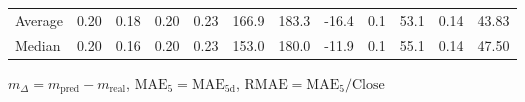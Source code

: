 \begin{threeparttable}
{\begin{tabular}{lrrrrrrrrrrr}
Average &          0.20 &          0.18 &          0.20 &        0.23 &               166.9 &               183.3 &      -16.4 &                 0.1 &             53.1 &            0.14 &                  43.83 \\
 Median &          0.20 &          0.16 &          0.20 &        0.23 &               153.0 &               180.0 &      -11.9 &                 0.1 &             55.1 &            0.14 &                  47.50 \\
\bottomrule
\end{tabular}
}
\begin{tablenotes}\footnotesize
\item $m_\Delta=m_{\text{pred}}-m_{\text{real}}$,
$\mathrm{MAE}_5=\mathrm{MAE}_{5\text{d}}$,
$\mathrm{RMAE}=\mathrm{MAE}_5/\text{Close}$
\end{tablenotes}
\end{threeparttable}
\endgroup

